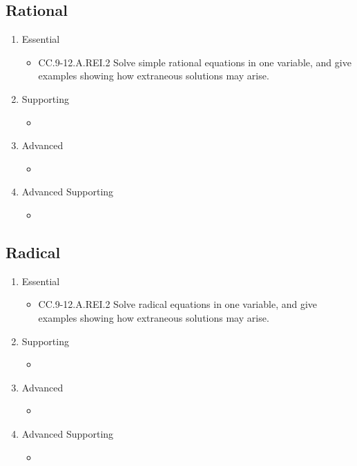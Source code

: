 \documentclass{article}
\begin{document}
\subsection*{Rational}
\begin{enumerate}
	\item Essential
	\begin{itemize}
		\item CC.9-12.A.REI.2 Solve simple rational equations in one variable, and give examples showing how extraneous solutions may arise.
	\end{itemize}		
	\item Supporting
	\begin{itemize}
		\item
	\end{itemize}
	\item Advanced
	\begin{itemize}
		\item
	\end{itemize}
	\item Advanced Supporting
	\begin{itemize}
		\item
	\end{itemize}
\end{enumerate}
\subsection*{Radical}
\begin{enumerate}
	\item Essential
	\begin{itemize}
		\item CC.9-12.A.REI.2 Solve radical equations in one variable, and give examples showing how extraneous solutions may arise.
	\end{itemize}		
	\item Supporting
	\begin{itemize}
		\item
	\end{itemize}
	\item Advanced
	\begin{itemize}
		\item
	\end{itemize}
	\item Advanced Supporting
	\begin{itemize}
		\item
	\end{itemize}
\end{enumerate}
\end{document}
